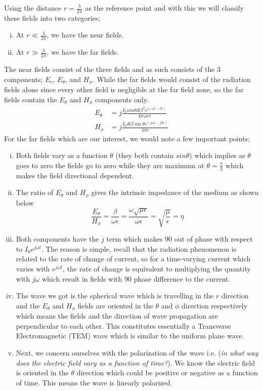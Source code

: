 Using the distance $r =  \frac{\lambda}{2 \pi}$ as the reference point and with this we will classify these fields into two categories;
\begin{enumerate}[(i)]
\item At $r \ll  \frac{\lambda}{2 \pi}$, we have the near fields.
\item At $r \gg  \frac{\lambda}{2 \pi}$, we have the far fields.
\end{enumerate}
The near fields consist of the three fields and as such consists of the 3 components; $E_r$, $E_{\theta}$, and $H_{\phi}$. While the far fields would consist of the radiation fields alone since every other field is negligible at the far field zone, so the far fields contain the $E_\theta$ and $H_\phi$ components only.
\begin{align}
E_{\theta} &= j\frac{I_0sin \theta dl\beta^2 e^{j(\omega t - \beta r)}}{4\pi \omega \epsilon r}\label{eqn:electricfarfield}\\
H_\phi &= j\frac{I_0 dl \beta \sin\theta   e^{(j\omega t-j\beta r)} }{4\pi r}\label{eqn:magneticfarfield}
\end{align}
For the far fields which are our interest, we would note a few important points;
\begin{enumerate}[(i)]
\item Both fields vary as a function $\theta$ (they both contain $sin\theta$) which implies as $\theta$ goes to zero the fields go to zero while they are maximum at $\theta = \frac{\pi}{2}$ which makes the field directional dependent. 
\item The ratio of $E_{\theta}$ and  $H_{\phi}$ gives the intrinsic impedance of the medium as shown below
$$\frac{E_{\theta}}{H_{\phi}} = \frac{\beta}{\omega  \epsilon} = \frac{\omega \sqrt{\mu \epsilon}}{\omega  \epsilon} = \sqrt{\frac{\mu}{\epsilon}} = \eta $$
\item Both components have the $j$ term which makes 90\textdegree\; out of phase with respect to $I_0e^{j\omega t}$. The reason is simple, recall that the radiation phenomenon is related to the rate of change of current, so for a time-varying current which varies with $e^{j\omega t}$, the rate of change is equivalent to multiplying the quantity with $j\omega $ which result in fields with 90\textdegree\; phase difference to the current.
\item The wave we got is the spherical wave which is travelling in the $r$ direction and the $E_\theta$ and $H_\phi$ fields are oriented in the $\theta$ and $\phi$ direction respectively which means the fields and the direction of wave propagation are perpendicular to each other. This constitutes essentially a Transverse Electromagnetic (TEM) wave which is similar to the uniform plane wave.
\item Next, we concern ourselves with the polarization of the wave i.e. (\emph{in what way does the electric field vary as a function of time?}). We know the electric field is oriented in the $\theta$ direction which could be positive or negative as a function of time. This means the wave is linearly polarized.
\end{enumerate}
